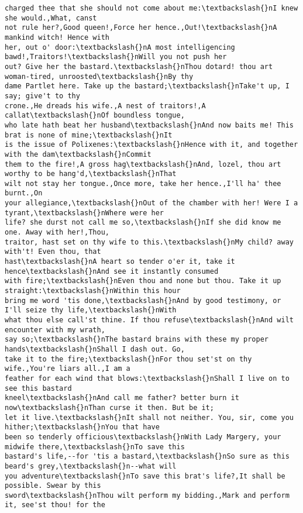 \documentclass[11pt]{article}
\begin{document}
\begin{tcolorbox}[breakable, size=fbox, boxrule=.5pt, pad at break*=1mm, opacityfill=0]
\begin{Verbatim}[commandchars=\\\{\}]
charged thee that she should not come about me:\textbackslash{}nI knew she would.,What, canst
not rule her?,Good queen!,Force her hence.,Out!\textbackslash{}nA mankind witch! Hence with
her, out o' door:\textbackslash{}nA most intelligencing bawd!,Traitors!\textbackslash{}nWill you not push her
out? Give her the bastard.\textbackslash{}nThou dotard! thou art woman-tired, unroosted\textbackslash{}nBy thy
dame Partlet here. Take up the bastard;\textbackslash{}nTake't up, I say; give't to thy
crone.,He dreads his wife.,A nest of traitors!,A callat\textbackslash{}nOf boundless tongue,
who late hath beat her husband\textbackslash{}nAnd now baits me! This brat is none of mine;\textbackslash{}nIt
is the issue of Polixenes:\textbackslash{}nHence with it, and together with the dam\textbackslash{}nCommit
them to the fire!,A gross hag\textbackslash{}nAnd, lozel, thou art worthy to be hang'd,\textbackslash{}nThat
wilt not stay her tongue.,Once more, take her hence.,I'll ha' thee burnt.,On
your allegiance,\textbackslash{}nOut of the chamber with her! Were I a tyrant,\textbackslash{}nWhere were her
life? she durst not call me so,\textbackslash{}nIf she did know me one. Away with her!,Thou,
traitor, hast set on thy wife to this.\textbackslash{}nMy child? away with't! Even thou, that
hast\textbackslash{}nA heart so tender o'er it, take it hence\textbackslash{}nAnd see it instantly consumed
with fire;\textbackslash{}nEven thou and none but thou. Take it up straight:\textbackslash{}nWithin this hour
bring me word 'tis done,\textbackslash{}nAnd by good testimony, or I'll seize thy life,\textbackslash{}nWith
what thou else call'st thine. If thou refuse\textbackslash{}nAnd wilt encounter with my wrath,
say so;\textbackslash{}nThe bastard brains with these my proper hands\textbackslash{}nShall I dash out. Go,
take it to the fire;\textbackslash{}nFor thou set'st on thy wife.,You're liars all.,I am a
feather for each wind that blows:\textbackslash{}nShall I live on to see this bastard
kneel\textbackslash{}nAnd call me father? better burn it now\textbackslash{}nThan curse it then. But be it;
let it live.\textbackslash{}nIt shall not neither. You, sir, come you hither;\textbackslash{}nYou that have
been so tenderly officious\textbackslash{}nWith Lady Margery, your midwife there,\textbackslash{}nTo save this
bastard's life,--for 'tis a bastard,\textbackslash{}nSo sure as this beard's grey,\textbackslash{}n--what will
you adventure\textbackslash{}nTo save this brat's life?,It shall be possible. Swear by this
sword\textbackslash{}nThou wilt perform my bidding.,Mark and perform it, see'st thou! for the

\end{Verbatim}
\end{tcolorbox}
\end{document}
